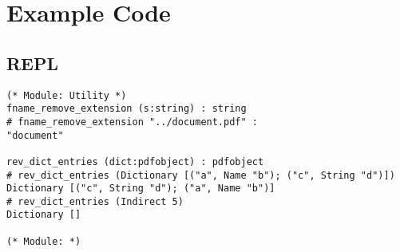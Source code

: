 \documentclass[11pt]{article}
\begin{document}
\section*{Example Code}
\subsection*{REPL}
\begin{verbatim}
(* Module: Utility *)
fname_remove_extension (s:string) : string
# fname_remove_extension "../document.pdf" : 
"document"

rev_dict_entries (dict:pdfobject) : pdfobject
# rev_dict_entries (Dictionary [("a", Name "b"); ("c", String "d")])
Dictionary [("c", String "d"); ("a", Name "b")]
# rev_dict_entries (Indirect 5)
Dictionary []

(* Module: *)


\end{verbatim}
\end{document}
